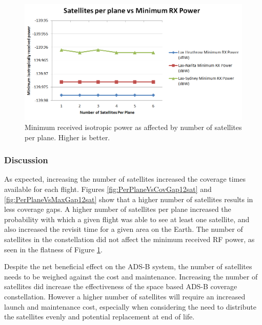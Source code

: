 \begin{figure}[H]
	\centering
	\includegraphics[scale = 0.6]{Pictures/PerPlaneVsRxPower12sat.png}
	
	\caption{Minimum received isotropic power as affected by number of satellites per plane. Higher is better.}
	\label{fig:PerPlaneVsRxPower12sat}
\end{figure}

\subsubsection{Discussion}
As expected, increasing the number of satellites increased the coverage times available for each flight. Figures \ref{fig:PerPlaneVsCovGap12sat} and \ref{fig:PerPlaneVsMaxGap12sat} show that a higher number of satellites results in less coverage gaps. A higher number of satellites per plane increased the probability with which a given flight was able to see at least one satellite, and also increased the revisit time for a given area on the Earth. The number of satellites in the constellation did not affect the minimum received RF power, as seen in the flatness of Figure \ref{fig:PerPlaneVsRxPower12sat}.

Despite the net beneficial effect on the ADS-B system, the number of satellites needs to be weighed against the cost and maintenance. Increasing the number of satellites did increase the effectiveness of the space based ADS-B coverage constellation. However a higher number of satellites will require an increased launch and maintenance cost, especially when considering the need to distribute the satellites evenly and potential replacement at end of life.


 
